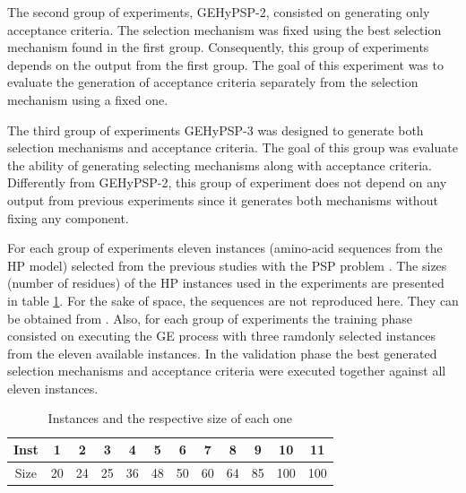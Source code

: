 \documentclass[conference]{IEEEtran}
\begin{document}
The second group of experiments, GEHyPSP-2, consisted on  generating only acceptance criteria. The selection mechanism was fixed using the best selection mechanism found in the first group. Consequently, this group of experiments depends on the output from the first group. The goal of this experiment was to evaluate the generation of acceptance criteria separately from the selection mechanism using a fixed one.



The third group of experiments GEHyPSP-3 was designed to  generate both selection mechanisms and acceptance criteria. The goal of this group was evaluate the ability of generating selecting mechanisms along with acceptance criteria. Differently from GEHyPSP-2, this group of experiment does not depend on any output from previous experiments since it generates both mechanisms without fixing any component.



For each group of experiments eleven instances (amino-acid sequences from the HP model) selected from the previous studies with the PSP problem \cite{custodio2004investigation,h,lin2011protein,santana2008component,custodio2014multiple}. The sizes (number of residues) of the HP instances used in the experiments are presented in table \ref{tab:instances}. 
 For the sake of space, the sequences are not reproduced here. They can be obtained from \cite{santana2008component}. Also, for each group of experiments the training phase consisted on executing the GE process with three ramdonly selected instances from the eleven available instances. In the validation phase the best generated selection mechanisms and acceptance criteria were executed together against all eleven instances. 

\begin{table}[]
	\centering
	\caption{Instances and the respective size of each one}
	\label{tab:instances}
	\begin{tabular}{cccccccccccc}
		Inst & 1 & 2 & 3 & 4 & 5 & 6 & 7 & 8 & 9 & 10 & 11 \\ \hline
		Size & 20 & 24 & 25 & 36 & 48 & 50 & 60 & 64 & 85 & 100 & 100 \\ \hline
	\end{tabular}
\end{table}
\end{document}
